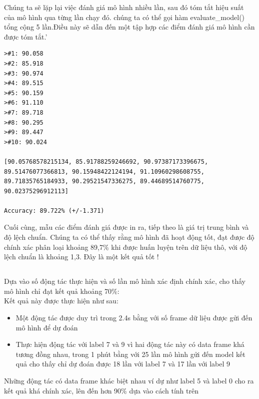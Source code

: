 Chúng ta sẽ lặp lại việc đánh giá mô hình nhiều lần, sau đó tóm tắt hiệu suất của mô hình qua từng lần chạy đó. chúng ta có thể gọi hàm evaluate\_model() tổng cộng 5 lần.Điều này sẽ dẫn đến một tập hợp các điểm đánh giá mô hình cần được tóm tắt.'\\

\begin{lstlisting}
>#1: 90.058
>#2: 85.918
>#3: 90.974
>#4: 89.515
>#5: 90.159
>#6: 91.110
>#7: 89.718
>#8: 90.295
>#9: 89.447
>#10: 90.024

[90.05768578215134, 85.91788259246692, 90.97387173396675, 89.51476077366813, 90.15948422124194, 91.10960298608755, 89.71835765184933, 90.29521547336275, 89.44689514760775, 90.02375296912113]

Accuracy: 89.722% (+/-1.371)

\end{lstlisting}
Cuối cùng, mẫu các điểm đánh giá được in ra, tiếp theo là giá trị trung bình và độ lệch chuẩn. Chúng ta có thể thấy rằng mô hình đã hoạt động tốt, đạt được độ chính xác phân loại khoảng 89,7\% khi được huấn luyện trên dữ liệu thô, với độ lệch chuẩn là khoảng 1,3. Đây là một kết quả tốt ! 
\subsection{}

Dựa vào số động tác thực hiện và số lần mô hình xác định chính xác, cho thấy mô hình chỉ đạt kết quả khoảng 70\%: \\

Kết quả này được thực hiện như sau:\\
\begin{itemize}
    \item Một động tác được duy trì trong 2.4s bằng với số frame dữ liệu được gửi đến mô hình để dự đoán
    \item Thực hiện động tác với label 7 và 9 vì hai động tác này có data frame khá tương đồng nhau,  trong 1 phút bằng với 25 lần mô hình gửi đến model kết quả cho thấy chỉ dự đoán được 18 lần với label 7 và 17 lần với label 9
\end{itemize}
Những động tác có data frame khác biệt nhau ví dự như label 5 và label 0 cho ra kết quả khá chính xác, lên đến hơn 90\% dựa vào cách tính trên



